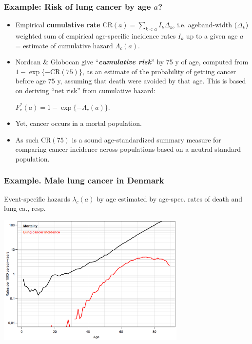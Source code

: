 \documentclass[handout,12pt]{beamer}
\newcommand{\e}{\mathrm{\bf e}}
\begin{document}
\begin{frame}
   \frametitle{Example: Risk of lung cancer by age $a$?}

\begin{itemize}
\item 
 Empirical \textbf{cumulative rate} 
CR$(a) = \sum_{k < a} I_k \Delta_k$, i.e.
 ageband-width ($\Delta_k$) weighted 
 sum of empirical 
 age-specific incidence rates $I_k$
 up to a given age $a$ \\
 = estimate of cumulative hazard $\Lambda_c(a)$.
 \medskip
 \item 
 Nordcan \& Globocan give 
``\textbf{\textit{cumulative risk}}'' by 75 y of age, computed from 
$1 - \exp\{-\text{CR}(75)\}$, as an estimate  of the probability of 
getting cancer before age $75$ y, 
assuming that death were avoided by that age. This is based on 
deriving ``net risk'' from cumulative hazard:
\begin{center} 
$ F_c^*(a) = 1 - \exp\{ - \Lambda_c(a) \}. $
\end{center}
\medskip
\item
Yet, cancer occurs in a mortal population.
\medskip
\item
As such CR$({75})$ is a sound age-standardized summary 
 measure for comparing cancer incidence across populations 
 based on a neutral standard population.
\end{itemize}

\end{frame}
 
 
 
\begin{frame}
\frametitle{Example. Male lung cancer in Denmark}

Event-specific hazards $\lambda_c(a)$ by age estimated by age-spec. rates of death and lung ca., resp.

\includegraphics[height=6.5cm]{lung-ca-rates}
\end{frame}
  
\end{document}
